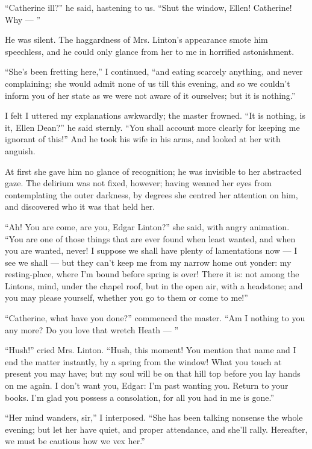 \par “Catherine ill?” he said, hastening to us. “Shut the window, Ellen! Catherine! Why — ”
\par He was silent. The haggardness of Mrs. Linton's appearance smote him speechless, and he could only glance from her to me in horrified astonishment.
\par “She's been fretting here,” I continued, “and eating scarcely anything, and never complaining; she would admit none of us till this evening, and so we couldn't inform you of her state as we were not aware of it ourselves; but it is nothing.”
\par I felt I uttered my explanations awkwardly; the master frowned. “It is nothing, is it, Ellen Dean?” he said sternly. “You shall account more clearly for keeping me ignorant of this!” And he took his wife in his arms, and looked at her with anguish.
\par At first she gave him no glance of recognition; he was invisible to her abstracted gaze. The delirium was not fixed, however; having weaned her eyes from contemplating the outer darkness, by degrees she centred her attention on him, and discovered who it was that held her.
\par “Ah! You are come, are you, Edgar Linton?” she said, with angry animation. “You are one of those things that are ever found when least wanted, and when you are wanted, never! I suppose we shall have plenty of lamentations now — I see we shall — but they can't keep me from my narrow home out yonder: my resting-place, where I'm bound before spring is over! There it is: not among the Lintons, mind, under the chapel roof, but in the open air, with a headstone; and you may please yourself, whether you go to them or come to me!”
\par “Catherine, what have you done?” commenced the master. “Am I nothing to you any more? Do you love that wretch Heath — ”
\par “Hush!” cried Mrs. Linton. “Hush, this moment! You mention that name and I end the matter instantly, by a spring from the window! What you touch at present you may have; but my soul will be on that hill top before you lay hands on me again. I don't want you, Edgar: I'm past wanting you. Return to your books. I'm glad you possess a consolation, for all you had in me is gone.”
\par “Her mind wanders, sir,” I interposed. “She has been talking nonsense the whole evening; but let her have quiet, and proper attendance, and she'll rally. Hereafter, we must be cautious how we vex her.”
